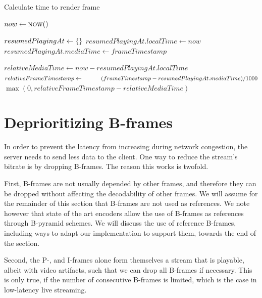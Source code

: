 
\begin{algorithm}
\caption{Calculate time to render frame}\label{alg:time_until_frame}
\begin{algorithmic}
    \State $now \gets \Call{now}{\null}$
    \item[]
        \State $resumedPlayingAt \gets \textnormal{\{\}}$
        \State $resumedPlayingAt.localTime \gets now$
        \State $resumedPlayingAt.mediaTime \gets frameTimestamp$
    \EndIf
    \item[]
    \State $relativeMediaTime \gets now - resumedPlayingAt.localTime$
    \State $relativeFrameTimestamp \gets \newline
        \hspace*{3em}(frameTimestamp - resumedPlayingAt.mediaTime) / 1000$
    \State \Return $\max(0, relativeFrameTimestamp - relativeMediaTime)$
\EndFunction
\end{algorithmic}
\end{algorithm}


\section{Deprioritizing B-frames}\label{chapter:deprioritizing_b_frames}
In order to prevent the latency from increasing during network congestion, the server needs to send less data to the client. One way to reduce the stream's bitrate is by dropping B-frames. The reason this works is twofold. 

First, B-frames are not usually depended by other frames, and therefore they can be dropped without affecting the decodability of other frames. We will assume for the remainder of this section that B-frames are not used as references. We note however that state of the art encoders allow the use of B-frames as references through B-pyramid schemes. We will discuss the use of reference B-frames, including ways to adapt our implementation to support them, towards the end of the section. %

Second, the P-, and I-frames alone form themselves a stream that is playable, albeit with video artifacts, such that we can drop all B-frames if necessary. This is only true, if the number of consecutive B-frames is limited, which is the case in low-latency live streaming. %


